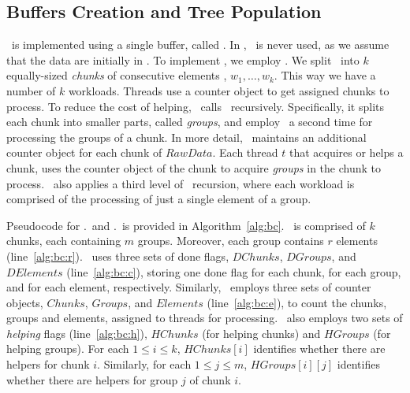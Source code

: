\subsection{Buffers Creation and Tree Population} 
\label{sec:buffers_and_tree}

\BC\ is implemented using a single buffer, called \RawData.
In \BC, \Put\ is never used, as we assume that the data are initially in \RawData.
% 
To implement \Traverse, we employ \Refresh.  
We split \RawData\ into $k$ equally-sized {\em chunks} of consecutive 
elements , $w_1, \ldots, w_k$. This way we have a number of 
$k$ workloads. 
Threads use a counter object to get assigned chunks to process.
To reduce the cost of helping, \Fresh\ calls \Refresh\ recursively.
Specifically, it splits each chunk into smaller parts,
called {\em groups}, and employ \Refresh\ a second time for processing the groups of a chunk.
% 
In more detail, \Fresh\ maintains an additional counter object 
for each chunk of $RawData$. 
Each thread $t$ that acquires or helps a chunk, uses the counter object of the chunk to acquire
{\em groups} in the chunk to process. \Fresh\ also applies a third level of \Refresh\ recursion,
where each workload is comprised of the processing of just a single element of a group. 

Pseudocode for \BC.\Put\ and \BC.\Traverse\ is provided 
in Algorithm~\ref{alg:bc}. \RawData\ is comprised of $k$ chunks,
each containing $m$ groups. Moreover, each group contains $r$ elements (line~\ref{alg:bc:r}). 
\Fresh\ uses three sets of done flags, $\mathit{DChunks}$, $\mathit{DGroups}$,
and $\mathit{DElements}$ (line~\ref{alg:bc:c}), storing one done flag for each chunk,
for each group, and for each element, respectively.
% 
Similarly, \Fresh\ employs three sets of counter objects, $\mathit{Chunks}$, $\mathit{Groups}$,
and $\mathit{Elements}$ (line~\ref{alg:bc:e}), to count the chunks, groups and elements, assigned
to threads for processing. 
%
\Fresh\ also employs two sets of {\em helping} flags (line~\ref{alg:bc:h}), 
$\mathit{HChunks}$  (for helping chunks) and $\mathit{HGroups}$ (for helping groups). 
For each $1 \leq i \leq k$, $\mathit{HChunks[i]}$ identifies whether there are helpers for chunk $i$.
Similarly, for each $1 \leq j \leq m$, $\mathit{HGroups[i][j]}$ identifies whether there are helpers
for group $j$ of chunk $i$. 

